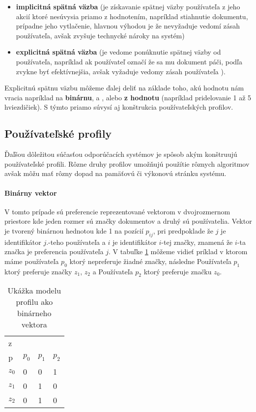 \begin{itemize}
\item{\textbf{implicitná spätná väzba} (je získavanie spätnej väzby používateľa z jeho akcií
ktoré nesúvysia priamo z hodnotením, napríklad stiahnutie dokumentu, prípadne jeho vytlačenie, 
hlavnou výhodou je že nevyžaduje vedomí zásah používateľa, avšak zvyšuje technycké nároky na 
systém) }
\item{\textbf{explicitná spätná väzba} (je vedome ponúknutie spätnej väzby od používateľa,
napríklad ak používateľ označí že sa mu dokument páči, podľa \cite{basic_user_profiles}
zvykne byť efektívnejšia, avšak vyžaduje vedomy zásah používateľa )}.
\end{itemize}

Explicitnú spätnu väzbu môžeme ďalej deliť na základe toho, akú hodnotu nám vracia napríklad 
na \textbf{binárnu},  a , alebo \textbf{z hodnotu} (napríklad
pridelovanie 1 až 5 hviezdičiek). S týmto priamo súvysí aj konštrukcia používateľských profilov.

\subsection{Používateľské profily}

Ďaľšou dôležitou súčasťou odporúčacích systémov je spôsob akým konštruujú používateľské profili.
Rôzne druhy profilov umožňujú použítie rôznych algoritmov avšak môžu mať rôzny dopad na 
pamäťovú či výkonovú stránku systému\cite{basic_user_profiles}.

\paragraph{Binárny vektor}

V tomto prípade sú preferencie reprezentované vektorom v dvojrozmernom priestore kde
jeden rozmer sú značky dokumentov a druhý sú používatelia. Vektor
je tvorený binárnou hednotou kde 1 na pozícií \(p_{ij}\), pri predpoklade že \(j\) je 
identifikátor \(j\).-teho používateľa a \(i\) je identifikátor \(i\)-tej značky,
znamená že \(i\)-ta značka je preferencia používateľa \(j\).
V tabuľke \ref{table:binaryprofile} môžeme vidieť príklad v ktorom máme používateľa \(p_0\)
ktorý nepreferuje žiadné značky, následne Používateľa \(p_1\) ktorý preferuje značky \(z_1\),
\(z_2\)
a Používateľa \(p_2\) ktorý preferuje značku \(z_0\).

\begin{table}[h]
\begin{center}
\begin{tabular}{|l|l|l|l|}
\hline
z\\p  & \(p_0\) & \(p_1\) & \(p_2\) \\ \hline
\(z_0\) & 0     & 0        & 1        \\ \hline
\(z_1\) & 0     & 1        & 0        \\ \hline
\(z_2\) & 0     & 1        & 0        \\ \hline
\end{tabular}
\end{center}
\caption{Ukážka modelu profilu ako binárneho vektora}
\label{table:binaryprofile}
\end{table}

